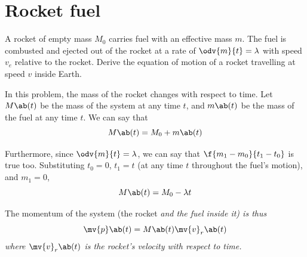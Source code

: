 \section{Rocket fuel}
\begin{problem}
  A rocket of empty mass \(M_0\) carries fuel with an effective mass \(m\).
  The fuel is combusted and ejected out of the rocket at a rate of
  \(\odv{m}{t} = \lambda\)
  with speed \(v_e\) relative to the rocket. Derive the equation of
  motion of a rocket travelling at speed \(v\) inside
  Earth.
\end{problem}

In this problem, the mass of the rocket changes with respect to time.
Let \(M\ab(t)\) be the mass
of the system at any time \(t\), and \(m\ab(t)\) be the mass of the fuel at any
time \(t\).
We can say that
\begin{equation}
  M\ab(t) = M_0 + m\ab(t)
\end{equation}

Furthermore, since \(\odv{m}{t}=\lambda\), we can say that
\(\f{m_1 - m_0}{t_1-t_0}\) is true too. Substituting \(t_0 = 0\),
\(t_1 = t\) (at any time \(t\) throughout the fuel's motion), and \(m_1 = 0\),
\begin{equation}
  M\ab(t) = M_0 - \lambda t
  \label{eq:systemmass}
\end{equation}

The momentum of the system (the rocket \it{and} the fuel inside it) is thus
\begin{equation}
  \mv{p}\ab(t) = M\ab(t)\mv{v}_r\ab(t)
  \label{eq:sysp}
\end{equation}
where \(\mv{v}_r\ab(t)\) is the rocket's velocity with respect to time.

